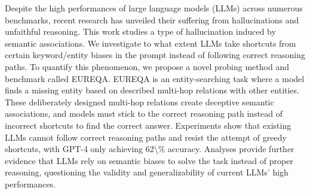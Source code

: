 Despite the high performances of large language models (LLMs) across numerous benchmarks, recent research has unveiled their suffering from hallucinations and unfaithful reasoning. This work studies a type of hallucination induced by semantic associations. We investigate to what extent LLMs take shortcuts from certain keyword/entity biases in the prompt instead of following correct reasoning paths. To quantify this phenomenon, we propose a novel probing method and benchmark called EUREQA. EUREQA is an entity-searching task where a model finds a missing entity based on described multi-hop relations with other entities. These deliberately designed multi-hop relations create deceptive semantic associations, and models must stick to the correct reasoning path instead of incorrect shortcuts to find the correct answer. Experiments show that existing LLMs cannot follow correct reasoning paths and resist the attempt of greedy shortcuts, with GPT-4 only achieving 62\textbackslash{}\% accuracy. Analyses provide further evidence that LLMs rely on semantic biases to solve the task  instead of proper reasoning, questioning the validity and generalizability of current LLMs' high performances.